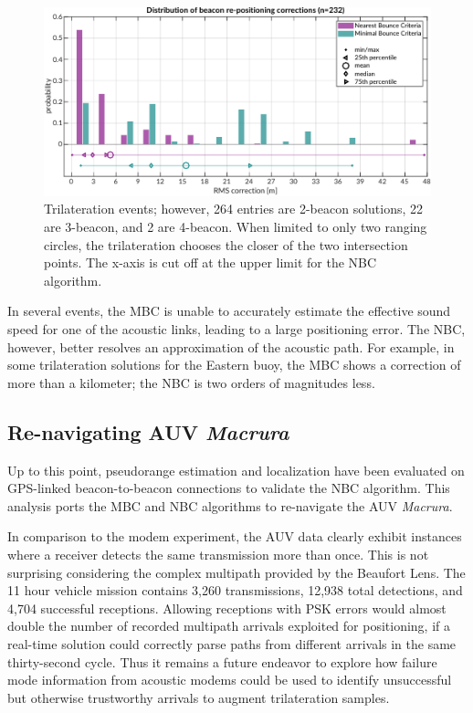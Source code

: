 \begin{figure}[!ht]
\includegraphics[width=\textwidth]{figs/beacon-trilat-stat.pdf}
\caption{Trilateration events; however, 264 entries are 2-beacon solutions, 22 are 3-beacon, and 2 are 4-beacon. When limited to only two ranging circles, the trilateration chooses the closer of the two intersection points. The x-axis is cut off at the upper limit for the NBC algorithm.}
\label{fig:trilat-beacon}
\end{figure}

In several events, the MBC is unable to accurately estimate the effective sound speed for one of the acoustic links, leading to a large positioning error.
The NBC, however, better resolves an approximation of the acoustic path.
For example, in some trilateration solutions for the Eastern buoy, the MBC shows a correction of more than a kilometer; the NBC is two orders of magnitudes less.

\subsection{Re-navigating AUV \emph{Macrura}}

Up to this point, pseudorange estimation and localization have been evaluated on GPS-linked beacon-to-beacon connections to validate the NBC algorithm.
This analysis ports the MBC and NBC algorithms to re-navigate the AUV \emph{Macrura}.

In comparison to the modem experiment, the AUV data clearly exhibit instances where a receiver detects the same transmission more than once.
This is not surprising considering the complex multipath provided by the Beaufort Lens.
The 11 hour vehicle mission contains 3,260 transmissions, 12,938 total detections, and 4,704 successful receptions.
Allowing receptions with PSK errors would almost double the number of recorded multipath arrivals exploited for positioning, if a real-time solution could correctly parse paths from different arrivals in the same thirty-second cycle.
Thus it remains a future endeavor to explore how failure mode information from acoustic modems could be used to identify unsuccessful but otherwise trustworthy arrivals to augment trilateration samples.

